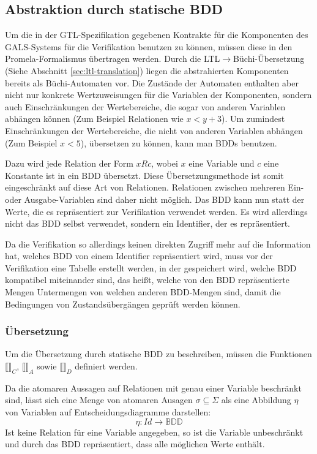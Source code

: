 \subsection{Abstraktion durch statische BDD}
Um die in der GTL-Spezifikation gegebenen Kontrakte für die Komponenten des GALS-Systems für die Verifikation benutzen zu können, müssen diese in den Promela-Formalismus übertragen werden.
Durch die LTL$\rightarrow$Büchi-Übersetzung (Siehe Abschnitt \ref{sec:ltl-translation}) liegen die abstrahierten Komponenten bereits als Büchi-Automaten vor.
Die Zustände der Automaten enthalten aber nicht nur konkrete Wertzuweisungen für die Variablen der Komponenten, sondern auch Einschränkungen der Wertebereiche, die sogar von anderen Variablen abhängen können (Zum Beispiel Relationen wie $x < y + 3$).
Um zumindest Einschränkungen der Wertebereiche, die nicht von anderen Variablen abhängen (Zum Beispiel $x < 5$), übersetzen zu können, kann man BDDs benutzen.

Dazu wird jede Relation der Form $x R c$, wobei $x$ eine Variable und $c$ eine Konstante ist in ein BDD übersetzt.
Diese Übersetzungsmethode ist somit eingeschränkt auf diese Art von Relationen.
Relationen zwischen mehreren Ein- oder Ausgabe-Variablen sind daher nicht möglich.
Das BDD kann nun statt der Werte, die es repräsentiert zur Verifikation verwendet werden.
Es wird allerdings nicht das BDD selbst verwendet, sondern ein Identifier, der es repräsentiert.

Da die Verifikation so allerdings keinen direkten Zugriff mehr auf die Information hat, welches BDD von einem Identifier repräsentiert wird, muss vor der Verifikation eine Tabelle erstellt werden, in der gespeichert wird, welche BDD kompatibel miteinander sind, das heißt, welche von den BDD repräsentierte Mengen Untermengen von welchen anderen BDD-Mengen sind, damit die Bedingungen von Zustandsübergängen geprüft werden können.
\subsubsection{Übersetzung}
Um die Übersetzung durch statische BDD zu beschreiben, müssen die Funktionen $\llbracket\rrbracket_C$, $\llbracket\rrbracket_A$ sowie $\llbracket\rrbracket_D$ definiert werden.

Da die atomaren Aussagen auf Relationen mit genau einer Variable beschränkt sind, lässt sich eine Menge von atomaren Ausagen $\sigma\subseteq\Sigma$ als eine Abbildung $\eta$ von Variablen auf Entscheidungsdiagramme darstellen:
\[ \eta : \mathit{Id}\rightarrow\mathbb{BDD} \]
Ist keine Relation für eine Variable angegeben, so ist die Variable unbeschränkt und durch das BDD repräsentiert, dass alle möglichen Werte enthält.

